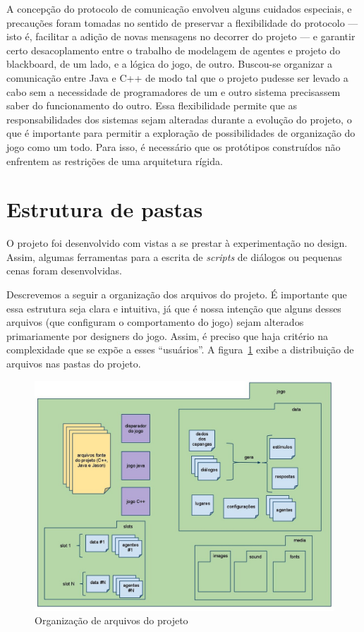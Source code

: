 A concepção do protocolo de comunicação envolveu alguns cuidados especiais, e precauções foram tomadas no sentido de preservar a flexibilidade do protocolo --- isto é, facilitar a adição de novas mensagens no decorrer do projeto --- e garantir certo desacoplamento entre o trabalho de modelagem de agentes e projeto do blackboard, de um lado, e a lógica do jogo, de outro. Buscou-se organizar a comunicação entre Java e C++ de modo tal que o projeto pudesse ser levado a cabo sem a necessidade de programadores de um e outro sistema precisassem saber do funcionamento do outro. Essa flexibilidade permite que as responsabilidades dos sistemas sejam alteradas durante a evolução do projeto, o que é importante para permitir a exploração de possibilidades de organização do jogo como um todo. Para isso, é necessário que os protótipos construídos não enfrentem as restrições de uma arquitetura rígida.

\section{Estrutura de pastas}\label{estruturaPastas}

O projeto foi desenvolvido com vistas a se prestar à experimentação no
design. Assim, algumas ferramentas para a escrita de \emph{scripts} de
diálogos ou pequenas cenas foram desenvolvidas.

Descrevemos a seguir a organização dos arquivos do projeto. É
importante que essa estrutura seja clara e intuitiva, já que é nossa
intenção que alguns desses arquivos (que configuram o comportamento
do jogo) sejam alterados primariamente por designers do jogo. Assim, é
preciso que haja critério na complexidade que se expõe a esses
``usuários''. A figura~\ref{fig:estrut-arquiv} exibe a distribuição de arquivos nas pastas do projeto.  

\begin{figure}
\centering
\includegraphics[width=\textwidth]{figuras/estrutura-arquivos.jpg}
\caption{Organização de arquivos do projeto}
\label{fig:estrut-arquiv}
\end{figure}


